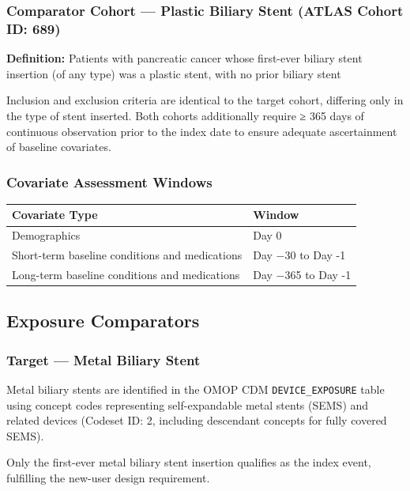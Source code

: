 \documentclass[
  12pt,
]{article}
\begin{document}
\subsubsection{Comparator Cohort --- Plastic Biliary Stent (ATLAS Cohort ID: 689)}\label{comparator-cohort-plastic-biliary-stent-atlas-cohort-id-689}

\textbf{Definition:} Patients with pancreatic cancer whose first-ever biliary stent insertion (of any type) was a plastic stent, with no prior biliary stent

Inclusion and exclusion criteria are identical to the target cohort, differing only in the type of stent inserted.
Both cohorts additionally require ≥ 365 days of continuous observation prior to the index date to ensure adequate ascertainment of baseline covariates.

\subsubsection{Covariate Assessment Windows}\label{covariate-assessment-windows}

\begin{longtable}[]{@{}ll@{}}
\toprule\noalign{}
Covariate Type & Window \\
\midrule\noalign{}
\endhead
\bottomrule\noalign{}
\endlastfoot
Demographics & Day 0 \\
Short-term baseline conditions and medications & Day −30 to Day -1 \\
Long-term baseline conditions and medications & Day −365 to Day -1 \\
\end{longtable}

\subsection{Exposure Comparators}\label{exposure-comparators}

\subsubsection{Target --- Metal Biliary Stent}\label{target-metal-biliary-stent}

Metal biliary stents are identified in the OMOP CDM \texttt{DEVICE\_EXPOSURE} table using concept codes representing self-expandable metal stents (SEMS) and related devices (Codeset ID: 2, including descendant concepts for fully covered SEMS).

Only the first-ever metal biliary stent insertion qualifies as the index event, fulfilling the new-user design requirement.
\end{document}
